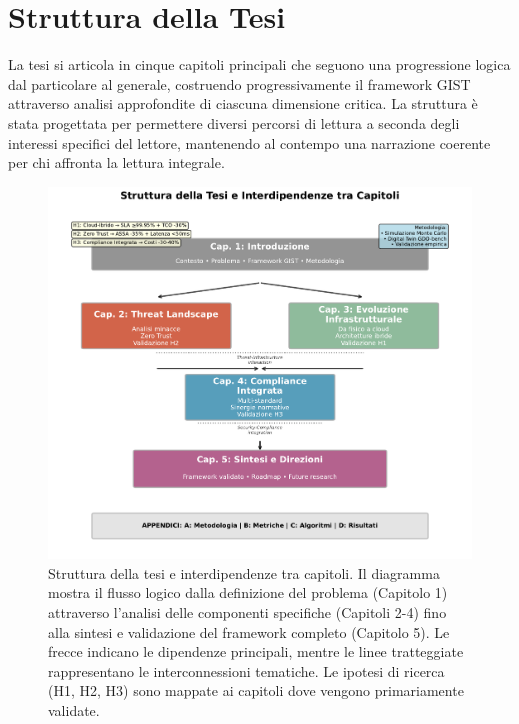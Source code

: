 \section{Struttura della Tesi}

La tesi si articola in cinque capitoli principali che seguono una progressione logica dal particolare al generale, costruendo progressivamente il framework GIST attraverso analisi approfondite di ciascuna dimensione critica. La struttura è stata progettata per permettere diversi percorsi di lettura a seconda degli interessi specifici del lettore, mantenendo al contempo una narrazione coerente per chi affronta la lettura integrale.

\begin{figure}[htbp]
\centering
\includegraphics[width=1.2\textwidth]{thesis_figures/cap1/fig_1_4_thesis_structure.pdf}
\caption{Struttura della tesi e interdipendenze tra capitoli. Il diagramma mostra il flusso logico dalla definizione del problema (Capitolo 1) attraverso l'analisi delle componenti specifiche (Capitoli 2-4) fino alla sintesi e validazione del framework completo (Capitolo 5). Le frecce indicano le dipendenze principali, mentre le linee tratteggiate rappresentano le interconnessioni tematiche. Le ipotesi di ricerca (H1, H2, H3) sono mappate ai capitoli dove vengono primariamente validate.}
\label{fig:thesis_structure}
\end{figure}

